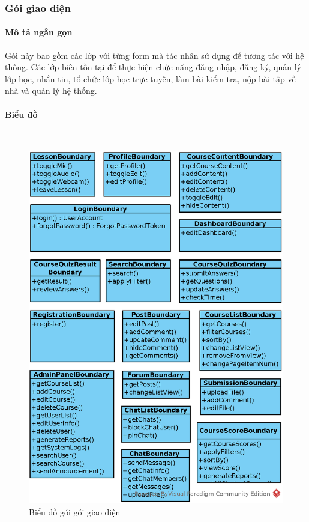 \documentclass[./../main_file.tex]{subfiles}
\begin{document}
	\subsubsection{Gói giao diện}
	\paragraph{Mô tả ngắn gọn}
	Gói này bao gồm các lớp với từng form mà tác nhân sử dụng để tương tác với hệ thống. Các lớp biên tồn tại để thực hiện chức năng đăng nhập, đăng ký, quản lý lớp học, nhắn tin, tổ chức lớp học trực tuyến, làm bài kiểm tra, nộp bài tập về nhà và quản lý hệ thống.
	\paragraph{Biểu đồ} ~\\
	\begin{figure}[H]
		\centering
				\includegraphics[width=\linewidth]{./images/PresentationPackage.eps}
		\caption{Biểu đồ gói gói giao diện}
	\end{figure}
\end{document}
